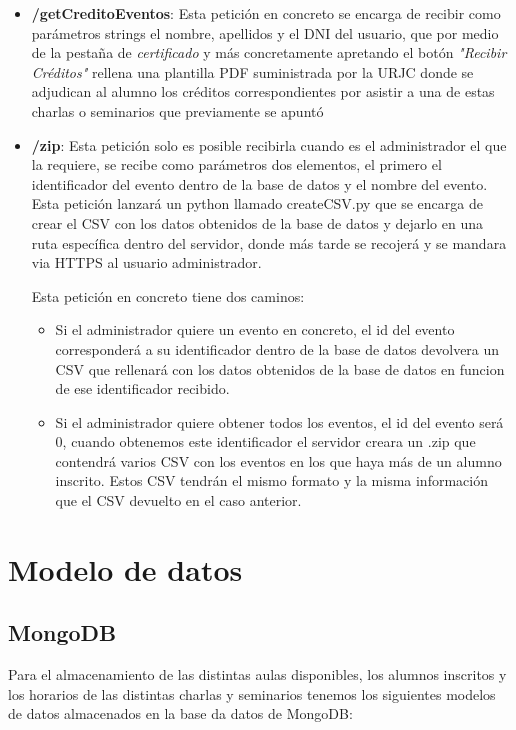 \documentclass[a4paper, 12pt]{book}
\begin{document}
\begin{itemize}
	\item \textbf{/getCreditoEventos}: Esta petición en concreto se encarga de recibir como parámetros strings el nombre, apellidos y el DNI del usuario, que por medio de la pestaña de \textit{certificado} y más concretamente apretando el botón \textit{"Recibir Créditos"} rellena una plantilla PDF suministrada por la URJC donde se adjudican al alumno los créditos correspondientes por asistir a una de estas charlas o seminarios que previamente se apuntó
	

	\item \textbf{/zip}: Esta petición solo es posible recibirla cuando es el administrador el que la requiere, se recibe como parámetros dos elementos, el primero el identificador del evento dentro de la base de datos y el nombre del evento. Esta petición lanzará un python llamado createCSV.py que se encarga de crear el CSV con los datos obtenidos de la base de datos y dejarlo en una ruta específica dentro del servidor, donde más tarde se recojerá y se mandara via HTTPS al usuario administrador.

Esta petición en concreto tiene dos caminos:
\begin{itemize}
	\item  Si el administrador quiere un evento en concreto, el id del evento corresponderá a su identificador dentro de la base de datos devolvera un CSV que rellenará con los datos obtenidos de la base de datos en funcion de ese identificador recibido. 
	\item Si el administrador quiere obtener todos los eventos, el id del evento será 0, cuando obtenemos este identificador el servidor creara un .zip que contendrá varios CSV con los eventos en los que haya más de un alumno inscrito. Estos CSV tendrán el mismo formato y la misma información que el CSV devuelto en el caso anterior.
\end{itemize}
\end{itemize}


\section{Modelo de datos} 
\label{sec:modelo de datos}

\subsection{MongoDB}
	Para el almacenamiento de las distintas aulas disponibles, los alumnos inscritos y los horarios de las distintas charlas y seminarios tenemos los siguientes modelos de datos almacenados en la base da datos de MongoDB:
	
\end{document}
